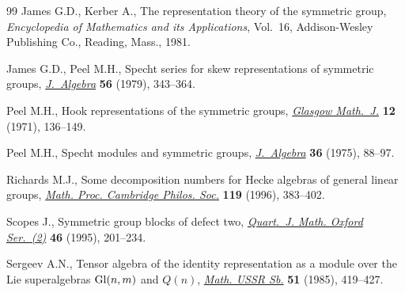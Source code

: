 \documentclass[pdftex]{sigma}
\begin{document}
\begin{thebibliography}{99}
James G.D., Kerber A., The representation theory of the symmetric group,
 \textit{Encyclopedia of Mathematics and its Applications}, Vol.~16,
 Addison-Wesley Publishing Co., Reading, Mass., 1981.

James G.D., Peel M.H., Specht series for skew representations of symmetric
 groups, \href{https://doi.org/10.1016/0021-8693(79)90342-9}{\textit{J.~Algebra}} \textbf{56} (1979), 343--364.

Peel M.H., Hook representations of the symmetric groups, \href{https://doi.org/10.1017/S0017089500001245}{\textit{Glasgow
 Math.~J.}} \textbf{12} (1971), 136--149.

Peel M.H., Specht modules and symmetric groups, \href{https://doi.org/10.1016/0021-8693(75)90158-1}{\textit{J.~Algebra}} \textbf{36}
 (1975), 88--97.

Richards M.J., Some decomposition numbers for {H}ecke algebras of general
 linear groups, \href{https://doi.org/10.1017/S0305004100074296}{\textit{Math. Proc. Cambridge Philos. Soc.}} \textbf{119}
 (1996), 383--402.

Scopes J., Symmetric group blocks of defect two, \href{https://doi.org/10.1093/qmath/46.2.201}{\textit{Quart.~J. Math. Oxford
 Ser.~(2)}} \textbf{46} (1995), 201--234.

Sergeev A.N., Tensor algebra of the identity representation as a module over
 the {L}ie superalgebras {${\rm Gl}(n,m)$} and {$Q(n)$}, \href{https://doi.org/10.1070/SM1985v051n02ABEH002867}{\textit{Math. USSR
 Sb.}} \textbf{51} (1985), 419--427.

\end{thebibliography}\LastPageEnding
\end{document}
